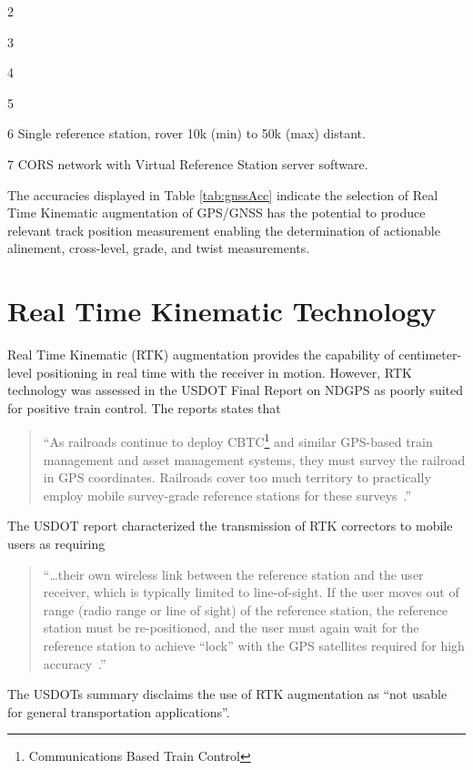 \begin{center}
\begin{threeparttable}[ht]
\begin{tablenotes}
	\item[2]~\citep{WAAS09}
	\item[3]~\citep{USFHAndgps}
	\item[4]~\citep{Trimble5700}
	\item[5]~\citep{TrimbleVRS}
	\item[6]{Single reference station, rover 10k (min) to 50k (max) distant.}
	\item[7]{CORS network with Virtual Reference Station server software.}\\
\end{tablenotes}
\end{threeparttable}
\end{center}

The accuracies displayed in Table \ref{tab:gnssAcc} indicate the selection of Real Time Kinematic augmentation of GPS/GNSS has the potential to produce relevant track position measurement enabling the determination of actionable alinement, cross-level, grade, and twist measurements.

\section{Real Time Kinematic Technology}
Real Time Kinematic (RTK) augmentation provides the capability of centimeter-level positioning in real time with the receiver in motion. However, RTK technology was assessed in the USDOT Final Report on NDGPS as poorly suited for positive train control. The reports states that

\begin{quotation}``As railroads continue to deploy CBTC\footnote{Communications Based Train Control} and similar GPS-based train management and asset management systems, they must survey the railroad in GPS coordinates. Railroads cover too much territory to practically employ mobile survey-grade reference stations for these surveys~\citep[pp.12]{2008USDoT_NDGPS}.''\end{quotation}

The USDOT report  characterized the transmission of RTK correctors to mobile users as requiring
\begin{quotation}``\ldots their own wireless link between the reference station and the user receiver, which is typically limited to line-of-sight. If the user moves out of range (radio range or line of sight) of the reference station, the reference station must be re-positioned, and the user must again wait for the reference station to achieve ``lock'' with the GPS satellites required for high accuracy~\citep{2008USDoT_NDGPS}.''\end{quotation}
The USDOTs summary disclaims the use of RTK augmentation as ``not usable for general transportation applications''\citep[ES-7]{2008USDoT_NDGPS}.

